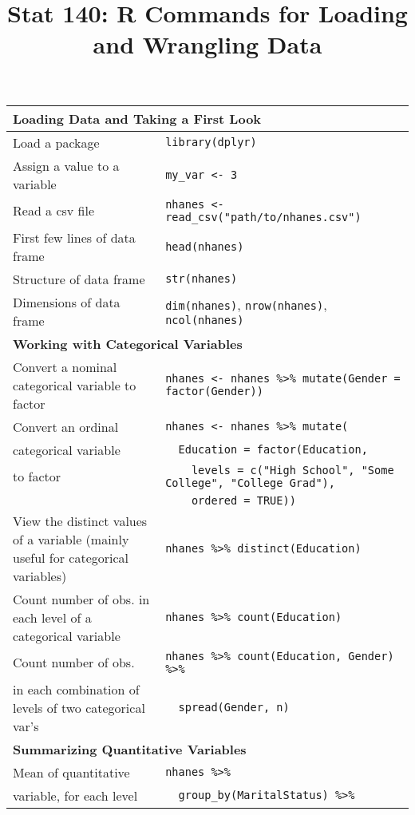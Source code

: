 \documentclass[]{article}
\title{Stat 140: R Commands for Loading and Wrangling Data}
\author{}
\date{}
\begin{document}
\maketitle

\begin{table}[!h]
\begin{tabular}{p{4.25cm} p{12.5cm}}
\toprule
\multicolumn{2}{l}{\textbf{Loading Data and Taking a First Look}} \\
\midrule
Load a package & \verb&library(dplyr)& \\
\midrule
Assign a value to a variable & \verb&my_var <- 3& \\
\midrule
Read a csv file & \verb&nhanes <- read_csv("path/to/nhanes.csv")& \\
\midrule
First few lines of data frame & \verb&head(nhanes)& \\
\midrule
Structure of data frame & \verb&str(nhanes)& \\
\midrule
Dimensions of data frame & \verb&dim(nhanes)&, \verb&nrow(nhanes)&, \verb&ncol(nhanes)& \\
\midrule
\multicolumn{2}{l}{\textbf{Working with Categorical Variables}} \\
\midrule
Convert a nominal categorical variable to factor & \verb&nhanes <- nhanes %>% mutate(Gender = factor(Gender))& \\
\midrule
Convert an ordinal & \verb&nhanes <- nhanes %>% mutate(& \\
categorical variable & \verb&  Education = factor(Education,& \\
to factor & \verb&    levels = c("High School", "Some College", "College Grad"),& \\
 & \verb&    ordered = TRUE))& \\
\midrule
View the distinct values of a variable (mainly useful for categorical variables) & \verb&nhanes %>% distinct(Education)& \\
\midrule
Count number of obs. in each level of a categorical variable & \verb&nhanes %>% count(Education)& \\
\midrule
Count number of obs. & \verb&nhanes %>% count(Education, Gender) %>%& \\
in each combination of levels of two categorical var's & \verb&  spread(Gender, n)& \\
\midrule
\multicolumn{2}{l}{\textbf{Summarizing Quantitative Variables}} \\
\midrule
Mean of quantitative      & \verb&nhanes %>%& \\
variable, for each level  & \verb&  group_by(MaritalStatus) %>%& \\

\end{tabular}
\end{table}
\end{document}
